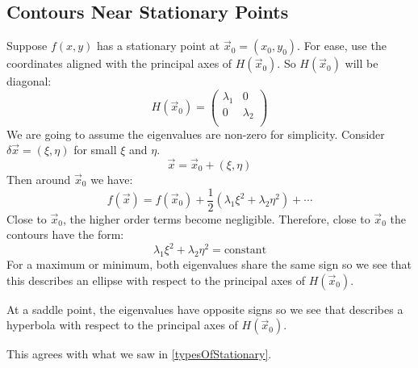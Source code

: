 \documentclass[../main.tex]{subfiles}
\begin{document}
\subsection{Contours Near Stationary Points}
Suppose $f(x, y)$ has a stationary point at $\vec{x}_0 = (x_0, y_0)$.
For ease, use the coordinates aligned with the principal axes of $H(\vec{x}_0)$.
So $H(\vec{x}_0)$ will be diagonal:
\[
  H(\vec{x}_0) = \begin{pmatrix}
  \lambda_1 & 0 \\
  0 & \lambda_2 \\
  \end{pmatrix}
\]
We are going to assume the eigenvalues are non-zero for simplicity.
Consider $\delta \vec{x} = (\xi, \eta)$ for small $\xi$ and $\eta$.
\[
  \vec{x} = \vec{x}_0 + (\xi, \eta)
\]
Then around $\vec{x}_0$ we  have:
\[
  f(\vec{x}) = f(\vec{x}_0) + \frac{1}{2}(\lambda_1 \xi^2 + \lambda_2 \eta^2) + \cdots
\]
Close to $\vec{x}_0$, the higher order terms become negligible.
Therefore, close to $\vec{x}_0$ the contours have the form:
\[
  \lambda_1 \xi^2 + \lambda_2 \eta^2 = \text{constant}
\]
For a maximum or minimum, both eigenvalues share the same sign so we see that this describes an ellipse with respect to the principal axes of $H(\vec{x}_0)$.

At  a saddle point, the eigenvalues have opposite signs so we see that describes a hyperbola with respect to the principal axes of $H(\vec{x}_0)$.

This agrees with what we saw in \cref{typesOfStationary}.
\end{document}

